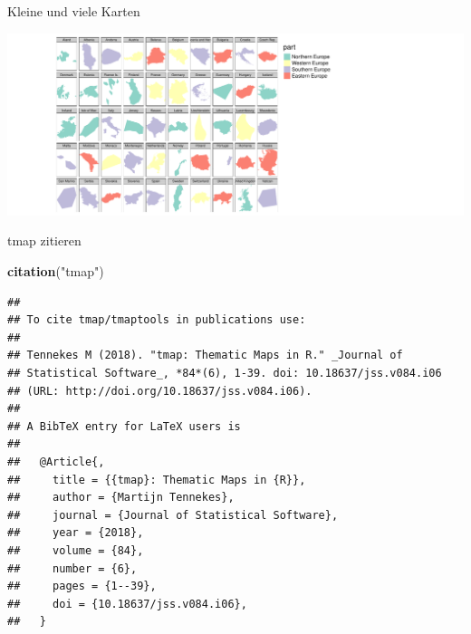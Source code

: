 \documentclass[ignorenonframetext,]{beamer}
\newenvironment{Shaded}{\begin{snugshade}}{\end{snugshade}}
\newcommand{\KeywordTok}[1]{\textcolor[rgb]{0.13,0.29,0.53}{\textbf{#1}}}
\newcommand{\DataTypeTok}[1]{\textcolor[rgb]{0.13,0.29,0.53}{#1}}
\newcommand{\DecValTok}[1]{\textcolor[rgb]{0.00,0.00,0.81}{#1}}
\newcommand{\StringTok}[1]{\textcolor[rgb]{0.31,0.60,0.02}{#1}}
\newcommand{\OtherTok}[1]{\textcolor[rgb]{0.56,0.35,0.01}{#1}}
\newcommand{\OperatorTok}[1]{\textcolor[rgb]{0.81,0.36,0.00}{\textbf{#1}}}
\newcommand{\NormalTok}[1]{#1}
\begin{document}
\begin{frame}[fragile]{Kleine und viele Karten}

\begin{Shaded}
\end{Shaded}

\includegraphics{tmap_files/figure-beamer/unnamed-chunk-51-1.pdf}

\end{frame}

\begin{frame}[fragile]{tmap zitieren}

\begin{Shaded}
\begin{Highlighting}[]
\KeywordTok{citation}\NormalTok{(}\StringTok{"tmap"}\NormalTok{)}
\end{Highlighting}
\end{Shaded}

\begin{verbatim}
## 
## To cite tmap/tmaptools in publications use:
## 
## Tennekes M (2018). "tmap: Thematic Maps in R." _Journal of
## Statistical Software_, *84*(6), 1-39. doi: 10.18637/jss.v084.i06
## (URL: http://doi.org/10.18637/jss.v084.i06).
## 
## A BibTeX entry for LaTeX users is
## 
##   @Article{,
##     title = {{tmap}: Thematic Maps in {R}},
##     author = {Martijn Tennekes},
##     journal = {Journal of Statistical Software},
##     year = {2018},
##     volume = {84},
##     number = {6},
##     pages = {1--39},
##     doi = {10.18637/jss.v084.i06},
##   }
\end{verbatim}

\end{frame}
\end{document}
